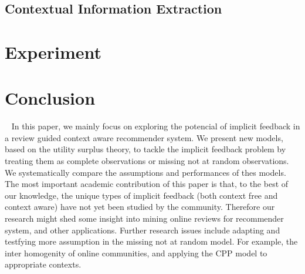 \documentclass{llncs}
\begin{document}
\subsection{Contextual Information Extraction}


\section{Experiment}\label{sec:exp}
\section{Conclusion}~\label{sec:con}
In this paper, we mainly focus on exploring the potencial of implicit feedback in a review guided context aware recommender system. We present new models, based on the utility surplus theory, to tackle the implicit feedback problem by treating them as complete observations or missing not at random observations. We systematically compare the assumptions and performances of thes models.
The most important academic contribution of this paper is that, to the best of our
knowledge, the unique types of implicit feedback (both context free and context aware) have not yet been studied by the community. Therefore our research might shed some insight into mining online reviews for recommender system, and other applications.
Further research issues include adapting and testfying more assumption in the missing not at random model.
For example, the inter homogenity of online communities, and applying the CPP model to appropriate contexts.
\end{document}
